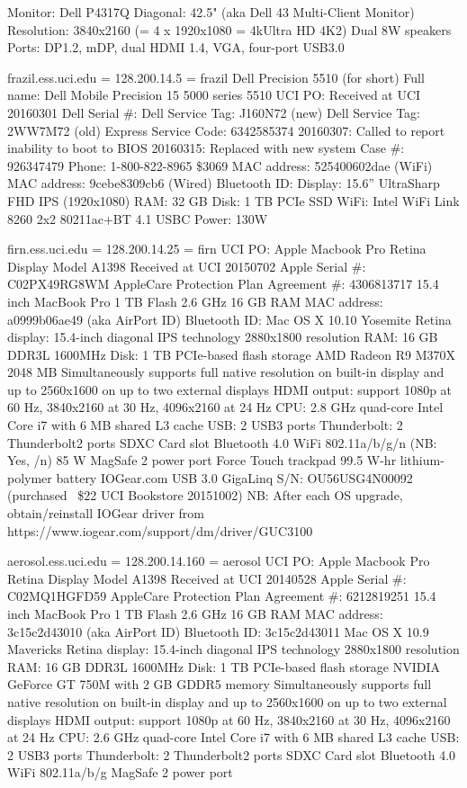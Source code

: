 \documentclass[12pt,twoside]{article}
\begin{document}
Monitor: Dell P4317Q
Diagonal: 42.5" (aka Dell 43 Multi-Client Monitor)
Resolution: 3840x2160 (= 4 x 1920x1080 = 4kUltra HD 4K2)
Dual 8W speakers
Ports: DP1.2, mDP, dual HDMI 1.4, VGA, four-port USB3.0

frazil.ess.uci.edu = 128.200.14.5 = frazil
Dell Precision 5510 (for short)
Full name: Dell Mobile Precision 15 5000 series 5510
UCI PO: 
Received at UCI 20160301
Dell Serial \#: 
Dell Service Tag: J160N72 (new)
Dell Service Tag: 2WW7M72 (old)
Express Service Code: 6342585374
20160307: Called to report inability to boot to BIOS
20160315: Replaced with new system
Case #: 926347479
Phone: 1-800-822-8965
\$3069
MAC address: 525400602dae (WiFi)
MAC address: 9cebe8309cb6 (Wired)
Bluetooth ID: 
Display: 15.6'' UltraSharp FHD IPS (1920x1080) 
RAM: 32 GB 
Disk: 1 TB PCIe SSD
WiFi: Intel WiFi Link 8260 2x2 80211ac+BT 4.1
USBC
Power: 130W

firn.ess.uci.edu = 128.200.14.25 = firn
UCI PO: 
Apple Macbook Pro Retina Display
Model A1398
Received at UCI 20150702
Apple Serial \#: C02PX49RG8WM
AppleCare Protection Plan Agreement \#: 4306813717
15.4 inch MacBook Pro
1 TB Flash
2.6 GHz
16 GB RAM
MAC address: a0999b06ae49 (aka AirPort ID)
Bluetooth ID: 
Mac OS X 10.10 Yosemite
Retina display: 15.4-inch diagonal
IPS technology 2880x1800 resolution
RAM: 16 GB DDR3L 1600MHz
Disk: 1 TB PCIe-based flash storage
AMD Radeon R9 M370X 2048 MB
Simultaneously supports full native resolution on built-in display and up to 2560x1600 on up to two external displays
HDMI output: support 1080p at 60 Hz, 3840x2160 at 30 Hz, 4096x2160 at 24 Hz
CPU: 2.8 GHz quad-core Intel Core i7 with 6 MB shared L3 cache
USB: 2 USB3 ports
Thunderbolt: 2 Thunderbolt2 ports
SDXC Card slot
Bluetooth 4.0
WiFi 802.11a/b/g/n (NB: Yes, /n)
85 W MagSafe 2 power port
Force Touch trackpad
99.5 W-hr lithium-polymer battery
IOGear.com USB 3.0 GigaLinq S/N: OU56USG4N00092 (purchased ~\$22 UCI Bookstore 20151002)
NB: After each OS upgrade, obtain/reinstall IOGear driver from
https://www.iogear.com/support/dm/driver/GUC3100 

aerosol.ess.uci.edu = 128.200.14.160 = aerosol
UCI PO: 
Apple Macbook Pro Retina Display
Model A1398
Received at UCI 20140528
Apple Serial \#: C02MQ1HGFD59
AppleCare Protection Plan Agreement \#: 6212819251
15.4 inch MacBook Pro
1 TB Flash
2.6 GHz
16 GB RAM
MAC address: 3c15c2d43010 (aka AirPort ID)
Bluetooth ID: 3c15c2d43011
Mac OS X 10.9 Mavericks
Retina display: 15.4-inch diagonal
IPS technology 2880x1800 resolution
RAM: 16 GB DDR3L 1600MHz
Disk: 1 TB PCIe-based flash storage
NVIDIA GeForce GT 750M with 2 GB GDDR5 memory
Simultaneously supports full native resolution on built-in display and up to 2560x1600 on up to two external displays
HDMI output: support 1080p at 60 Hz, 3840x2160 at 30 Hz, 4096x2160 at 24 Hz
CPU: 2.6 GHz quad-core Intel Core i7 with 6 MB shared L3 cache
USB: 2 USB3 ports
Thunderbolt: 2 Thunderbolt2 ports
SDXC Card slot
Bluetooth 4.0
WiFi 802.11a/b/g 
MagSafe 2 power port
\end{document}
